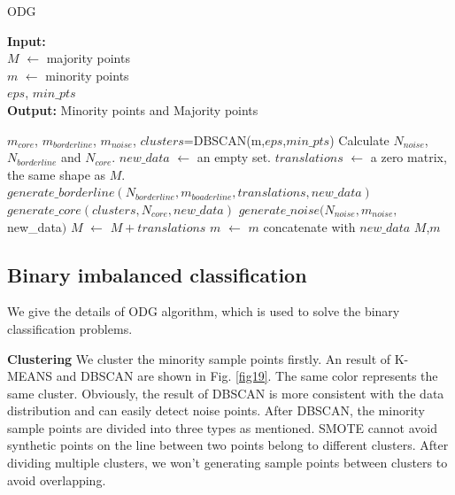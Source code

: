 \documentclass[ida]{iosart2x}
\begin{document}
  \begin{algorithm}[tbp]
    \caption{ODG} %
    \label{alg1}
    \hspace*{0.02in} {\bf Input:}
     \\$M$ $\leftarrow$ majority points  \\
     $m$ $\leftarrow$ minority points  \\
     $eps$, $min\_pts$\\
    \hspace*{0.02in} {\bf Output:} %
    Minority points and Majority points
    \begin{algorithmic}[1]
    \State $m_{core}$, $m_{borderline}$, $m_{noise}$, $clusters$=DBSCAN(m,$eps$,$min\_pts$) %
    \State Calculate $N_{noise}$, $N_{borderline}$ and $N_{core}$.
    \State $new\_data$ $\leftarrow$ an empty set.
    \State $translations$ $\leftarrow$ a zero matrix, the same shape as $M$.
    \State $generate\_borderline(N_{borderline},m_{boaderline},translations, new\_data)$
    \State $generate\_core(clusters,N_{core},new\_data)$
    \State $generate\_noise(N_{noise},m_{noise},$new\_data$)$
    \State $M$ $\leftarrow$ $M+translations$
    \State $m$ $\leftarrow$ $m$ concatenate with $new\_data$
    \State \Return $M$,$m$
    \end{algorithmic}
    \end{algorithm}

\subsection{Binary imbalanced classification}
We give the details of ODG algorithm, which is used to solve the binary classification problems.

\textbf{Clustering} We cluster the minority sample points firstly.
An result of K-MEANS and DBSCAN are shown in Fig. \ref{fig19}.
The same color represents the same cluster.
Obviously, the result of DBSCAN is more 
consistent with the data distribution and can easily detect noise points.
After DBSCAN, 
the minority sample points are divided into three types as mentioned.
SMOTE cannot avoid synthetic points on the line between 
two points belong to different clusters.
After dividing multiple clusters, 
we won't generating sample points between clusters to avoid overlapping.
\end{document}
